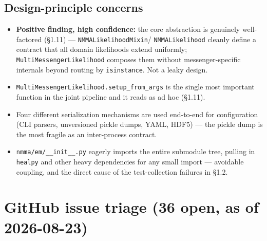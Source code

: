 \documentclass[10pt]{article}
\newcommand{\code}[1]{\texttt{#1}}
\begin{document}
\subsection{Design-principle concerns}
\begin{itemize}
\item \textbf{Positive finding, high confidence:} the core abstraction is
  genuinely well-factored (\S1.11) --- \code{NMMALikelihoodMixin}/
  \code{NMMALikelihood} cleanly define a contract that all domain likelihoods
  extend uniformly; \code{MultiMessengerLikelihood} composes them without
  messenger-specific internals beyond routing by \code{isinstance}. Not a leaky
  design.
\item \code{MultiMessengerLikelihood.setup\_from\_args} is the single most
  important function in the joint pipeline and it reads as ad hoc (\S1.11).
\item Four different serialization mechanisms are used end-to-end for
  configuration (CLI parsers, unversioned pickle dumps, YAML, HDF5) --- the
  pickle dump is the most fragile as an inter-process contract.
\item \code{nmma/em/\_\_init\_\_.py} eagerly imports the entire submodule tree,
  pulling in \code{healpy} and other heavy dependencies for any small import ---
  avoidable coupling, and the direct cause of the test-collection failures in
  \S1.2.
\end{itemize}

\section{GitHub issue triage (36 open, as of 2026-08-23)}
\end{document}
